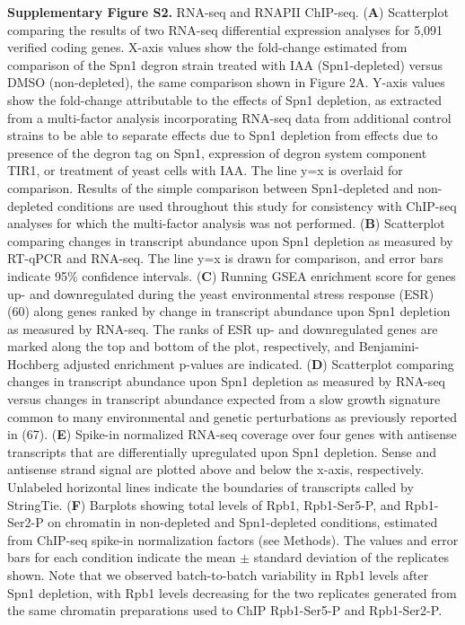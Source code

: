 \documentclass[8pt]{extarticle}
\begin{document}
\vspace{2em}
\textbf{Supplementary Figure S2.} RNA-seq and RNAPII ChIP-seq.
(\textbf{A}) Scatterplot comparing the results of two RNA-seq differential expression analyses for 5,091 verified coding genes.
X-axis values show the fold-change estimated from comparison of the Spn1 degron strain treated with IAA (Spn1-depleted) versus DMSO (non-depleted), the same comparison shown in Figure 2A.
Y-axis values show the fold-change attributable to the effects of Spn1 depletion, as extracted from a multi-factor analysis incorporating RNA-seq data from additional control strains to be able to separate effects due to Spn1 depletion from effects due to presence of the degron tag on Spn1, expression of degron system component TIR1, or treatment of yeast cells with IAA.
The line y=x is overlaid for comparison.
Results of the simple comparison between Spn1-depleted and non-depleted conditions are used throughout this study for consistency with ChIP-seq analyses for which the multi-factor analysis was not performed.
(\textbf{B}) Scatterplot comparing changes in transcript abundance upon Spn1 depletion as measured by RT-qPCR and RNA-seq. The line y=x is drawn for comparison, and error bars indicate 95\% confidence intervals.
(\textbf{C}) Running GSEA enrichment score for genes up- and downregulated during the yeast environmental stress response (ESR) (60) along genes ranked by change in transcript abundance upon Spn1 depletion as measured by RNA-seq.
The ranks of ESR up- and downregulated genes are marked along the top and bottom of the plot, respectively, and Benjamini-Hochberg adjusted enrichment p-values are indicated.
(\textbf{D}) Scatterplot comparing changes in transcript abundance upon Spn1 depletion as measured by RNA-seq versus changes in transcript abundance expected from a slow growth signature common to many environmental and genetic perturbations as previously reported in (67).
(\textbf{E}) Spike-in normalized RNA-seq coverage over four genes with antisense transcripts that are differentially upregulated upon Spn1 depletion.
Sense and antisense strand signal are plotted above and below the x-axis, respectively.
Unlabeled horizontal lines indicate the boundaries of transcripts called by StringTie.
(\textbf{F}) Barplots showing total levels of Rpb1, Rpb1-Ser5-P, and Rpb1-Ser2-P on chromatin in non-depleted and Spn1-depleted conditions, estimated from ChIP-seq spike-in normalization factors (see Methods).
The values and error bars for each condition indicate the mean $\pm$ standard deviation of the replicates shown.
Note that we observed batch-to-batch variability in Rpb1 levels after Spn1 depletion, with Rpb1 levels decreasing for the two replicates generated from the same chromatin preparations used to ChIP Rpb1-Ser5-P and Rpb1-Ser2-P.
\end{document}
